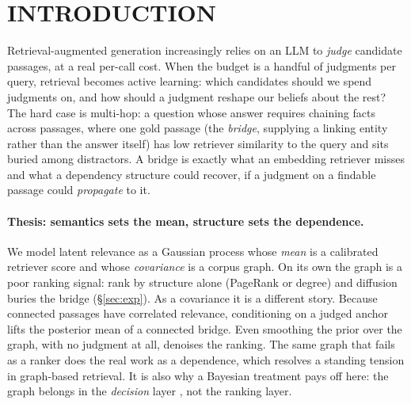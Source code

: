 \documentclass[twoside]{article}
\theoremstyle{plain}
\theoremstyle{definition}
\begin{document}
\section{INTRODUCTION}
Retrieval-augmented generation \citep{lewis2020rag} increasingly relies on an LLM to \emph{judge} candidate
passages, at a real per-call cost. When the budget is a handful of judgments per query, retrieval becomes active
learning: which candidates should we spend judgments on, and how should a judgment reshape our beliefs about the
rest? The hard case is multi-hop: a question whose answer requires chaining facts across passages, where one gold
passage (the \emph{bridge}, supplying a linking entity rather than the answer itself) has low retriever
similarity to the query and sits buried among distractors. A bridge is exactly what an embedding retriever misses
and what a dependency structure could recover, if a judgment on a findable passage could \emph{propagate} to it.

\paragraph{Thesis: semantics sets the mean, structure sets the dependence.} We model latent relevance as a
Gaussian process \citep{williams2006gpml} whose \emph{mean} is a calibrated retriever score and whose
\emph{covariance} is a corpus graph. On its own the graph is a poor ranking signal: rank by structure alone (PageRank or degree) and diffusion buries
the bridge (\S\ref{sec:exp}). As a covariance it is a different story. Because connected passages have correlated
relevance, conditioning on a judged anchor lifts the posterior mean of a connected bridge. Even smoothing the prior
over the graph, with no judgment at all, denoises the ranking. The same graph that fails as a ranker does the real
work as a dependence, which resolves a standing tension in graph-based retrieval. It is also why a Bayesian
treatment pays off here: the graph belongs in the \emph{decision} layer \citep{chaloner1995bed,lindley1956voi},
not the ranking layer.
\end{document}
